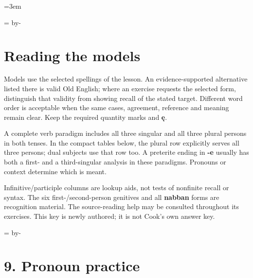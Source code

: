 \BookRecto
\begingroup
\renewcommand{\runningtitle}{Unit 2. Answer key}
\emergencystretch=3em
\newcommand{\itempara}[2]{\par\addvspace{3pt}\noindent\hangindent=1.8em\hangafter=1\makebox[1.8em][l]{#1.}#2\par}
\newcommand{\reserve}[1]{\par\begingroup\dimen0=\pagegoal\advance\dimen0 by-\pagetotal\ifdim\dimen0<#1\newpage\fi\endgroup}

\raggedright
{}

\reserve{7\baselineskip}
\section*{Reading the models}

Models use the selected spellings of the lesson. An evidence-supported alternative listed there is valid Old English; where an exercise requests the selected form, distinguish that validity from showing recall of the stated target. Different word order is acceptable when the same cases, agreement, reference and meaning remain clear. Keep the required quantity marks and \textbf{ę}.

A complete verb paradigm includes all three singular and all three plural persons in both tenses. In the compact tables below, the plural row explicitly serves all three persons; dual subjects use that row too. A preterite ending in \textbf{-e} usually has both a first- and a third-singular analysis in these paradigms. Pronouns or context determine which is meant.

Infinitive/\allowbreak{}participle columns are lookup aids, not tests of nonfinite recall or syntax. The six first-/\allowbreak{}second-person genitives and all \textbf{nabban} forms are recognition material. The source-reading help may be consulted throughout its exercises. This key is newly authored; it is not Cook’s own answer key.

\reserve{7\baselineskip}
\section*{9. Pronoun practice}

